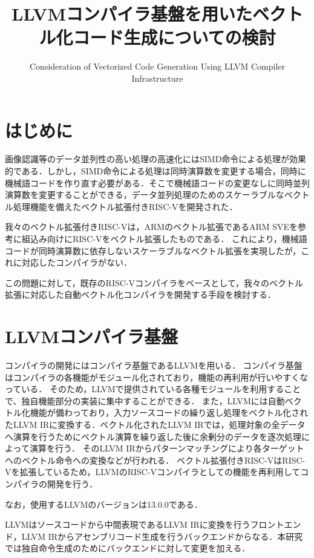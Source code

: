 ﻿\documentclass[a4j]{jarticle}
\title{LLVMコンパイラ基盤を用いたベクトル化コード生成についての検討}
\author{Consideration of Vectorized Code Generation Using LLVM Compiler Infrastructure}
\begin{document}
\maketitle

\section{はじめに}
画像認識等のデータ並列性の高い処理の高速化にはSIMD命令による処理が効果的である．しかし，SIMD命令による処理は同時演算数を変更する場合，同時に機械語コードを作り直す必要がある．そこで機械語コードの変更なしに同時並列演算数を変更することができる，データ並列処理のためのスケーラブルなベクトル処理機能を備えたベクトル拡張付きRISC-Vを開発された\cite{bib:kimura}．

我々のベクトル拡張付きRISC-Vは，ARMのベクトル拡張であるARM SVE\cite{bib:arm_sve}を参考に組込み向けにRISC-V\cite{bib:risc-v}をベクトル拡張したものである．
これにより，機械語コードが同時演算数に依存しないスケーラブルなベクトル拡張を実現したが，これに対応したコンパイラがない．

この問題に対して，既存のRISC-Vコンパイラをベースとして，我々のベクトル拡張に対応した自動ベクトル化コンパイラを開発する手段を検討する．

\section{LLVMコンパイラ基盤}
コンパイラの開発にはコンパイラ基盤であるLLVM\cite{bib:llvm}を用いる．
コンパイラ基盤はコンパイラの各機能がモジュール化されており，機能の再利用が行いやすくなっている．
そのため，LLVMで提供されている各種モジュールを利用することで、独自機能部分の実装に集中することができる．
また，LLVMには自動ベクトル化機能が備わっており，入力ソースコードの繰り返し処理をベクトル化されたLLVM IRに変換する．ベクトル化されたLLVM IRでは，処理対象の全データへ演算を行うためにベクトル演算を繰り返した後に余剰分のデータを逐次処理によって演算を行う．
そのLLVM IRからパターンマッチングにより各ターゲットへのベクトル命令への変換などが行われる．
ベクトル拡張付きRISC-VはRISC-Vを拡張しているため，LLVMのRISC-Vコンパイラとしての機能を再利用してコンパイラの開発を行う．

なお，使用するLLVMのバージョンは13.0.0である．

LLVMはソースコードから中間表現であるLLVM IRに変換を行うフロントエンド，LLVM IRからアセンブリコード生成を行うバックエンドからなる．本研究では独自命令生成のためにバックエンドに対して変更を加える．

\end{document}
